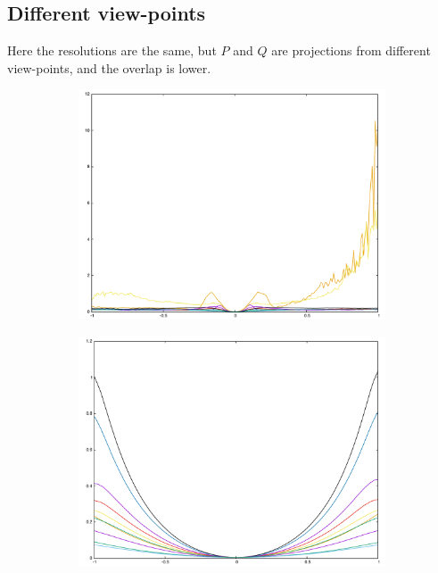 \subsection{Different view-points}
Here the resolutions are the same, but $P$ and $Q$ are projections from different view-points, and the overlap is lower.

\begin{figure}[H]
\begin{subfigure}{.33\textwidth}
	\includegraphics[width=\linewidth]{fig/ajherr/t2/L_chi.pdf}
\end{subfigure}%
\begin{subfigure}{.33\textwidth}
	\includegraphics[width=\linewidth]{fig/ajherr/t2/M_chi.pdf}

\end{subfigure}
\end{figure}
